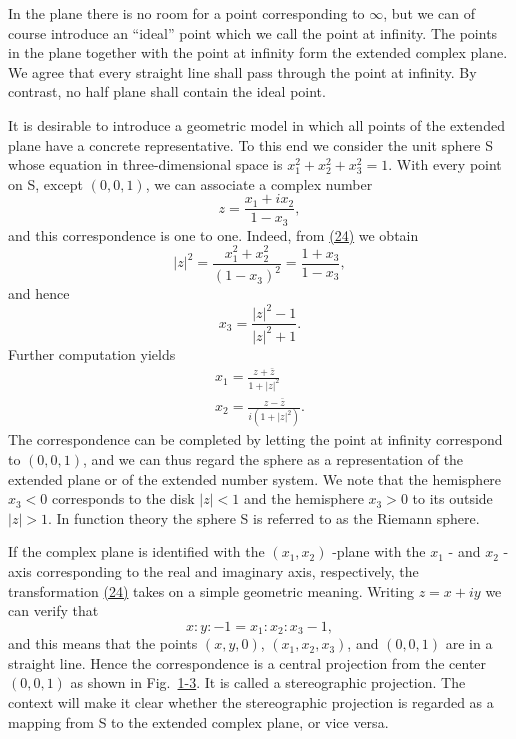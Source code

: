 In the plane there is no room for a point corresponding to $\infty$, but we can of course introduce an “ideal” point which we call the point at infinity. The points in the plane together with the point at infinity form the extended complex plane. We agree that every straight line shall pass through the point at infinity. By contrast, no half plane shall contain the ideal point.

It is desirable to introduce a geometric model in which all points of the extended plane have a concrete representative. To this end we consider the unit sphere S whose equation in three-dimensional space is $x_{1}^{2} + x_{2}^{2} + x_{3}^{2} = 1$. With every point on S, except $(0,0,1)$, we can associate a complex number
\begin{equation*}
z = \frac {x _ {1} + i x _ {2}}{1 - x _ {3}},\tag{24}\label{eq:1.24}
\end{equation*}
and this correspondence is one to one. Indeed, from \hyperref[eq:1.24]{(24)} we obtain
\begin{equation*}
| z | ^ {2} = \frac {x _ {1} ^ {2} + x _ {2} ^ {2}}{(1 - x _ {3}) ^ {2}} = \frac {1 + x _ {3}}{1 - x _ {3}},
\end{equation*}
and hence
\begin{equation*}
x _ {3} = \frac {| z | ^ {2} - 1}{| z | ^ {2} + 1}.\tag{25}\label{eq:1.25}
\end{equation*}
Further computation yields
\begin{equation*}
\begin{array}{l} x _ {1} = \frac {z + \bar {z}}{1 + | z | ^ {2}} \\ x _ {2} = \frac {z - \bar {z}}{i (1 + | z | ^ {2})}. \end{array}\tag{26}\label{eq:1.26}
\end{equation*}
The correspondence can be completed by letting the point at infinity correspond to $(0,0,1)$, and we can thus regard the sphere as a representation of the extended plane or of the extended number system. We note that the hemisphere $x_{3} < 0$ corresponds to the disk $|z| < 1$ and the
hemisphere $x_{3} > 0$ to its outside $|z| > 1$. In function theory the sphere S is referred to as the Riemann sphere.

If the complex plane is identified with the $(x_{1},x_{2})$ -plane with the $x_{1}$ - and $x_{2}$ -axis corresponding to the real and imaginary axis, respectively, the transformation \hyperref[eq:1.24]{(24)} takes on a simple geometric meaning. Writing $z = x + iy$ we can verify that
\begin{equation*}
x: y: - 1 = x _ {1}: x _ {2}: x _ {3} - 1,\tag{27}\label{eq:1.27}
\end{equation*}
and this means that the points $(x,y,0)$, $(x_{1},x_{2},x_{3})$, and $(0,0,1)$ are in a straight line. Hence the correspondence is a central projection from the center $(0,0,1)$ as shown in Fig.~\hyperref[fig:1-3]{1-3}. It is called a stereographic projection. The context will make it clear whether the stereographic projection is regarded as a mapping from S to the extended complex plane, or vice versa.

